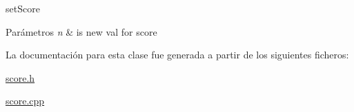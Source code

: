 set\+Score 


\begin{DoxyParams}{Parámetros}
{\em n} & is new val for score \\
\hline
\end{DoxyParams}


La documentación para esta clase fue generada a partir de los siguientes ficheros\+:\begin{DoxyCompactItemize}
\item 
\hyperlink{score_8h}{score.\+h}\item 
\hyperlink{score_8cpp}{score.\+cpp}\end{DoxyCompactItemize}
